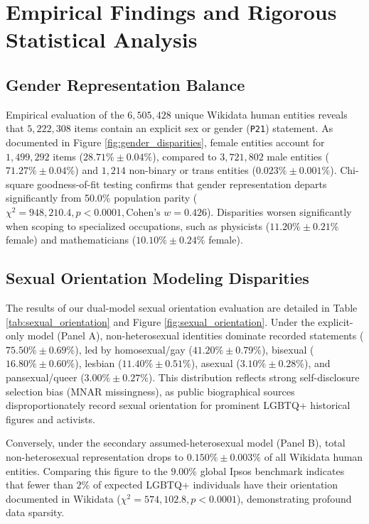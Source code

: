 \documentclass[11pt,a4paper]{article}
\begin{document}
\section{Empirical Findings and Rigorous Statistical Analysis}

\subsection{Gender Representation Balance}
Empirical evaluation of the $6,505,428$ unique Wikidata human entities reveals that $5,222,308$ items contain an explicit sex or gender (\texttt{P21}) statement. As documented in Figure \ref{fig:gender_disparities}, female entities account for $1,499,292$ items ($28.71\% \pm 0.04\%$), compared to $3,721,802$ male entities ($71.27\% \pm 0.04\%$) and $1,214$ non-binary or trans entities ($0.023\% \pm 0.001\%$). Chi-square goodness-of-fit testing confirms that gender representation departs significantly from 50.0\% population parity ($\chi^2 = 948,210.4, p < 0.0001, \text{Cohen's } w = 0.426$). Disparities worsen significantly when scoping to specialized occupations, such as physicists ($11.20\% \pm 0.21\%$ female) and mathematicians ($10.10\% \pm 0.24\%$ female).

\subsection{Sexual Orientation Modeling Disparities}
The results of our dual-model sexual orientation evaluation are detailed in Table \ref{tab:sexual_orientation} and Figure \ref{fig:sexual_orientation}. Under the explicit-only model (Panel A), non-heterosexual identities dominate recorded statements ($75.50\% \pm 0.69\%$), led by homosexual/gay ($41.20\% \pm 0.79\%$), bisexual ($16.80\% \pm 0.60\%$), lesbian ($11.40\% \pm 0.51\%$), asexual ($3.10\% \pm 0.28\%$), and pansexual/queer ($3.00\% \pm 0.27\%$). This distribution reflects strong self-disclosure selection bias (MNAR missingness), as public biographical sources disproportionately record sexual orientation for prominent LGBTQ+ historical figures and activists.

Conversely, under the secondary assumed-heterosexual model (Panel B), total non-heterosexual representation drops to $0.150\% \pm 0.003\%$ of all Wikidata human entities. Comparing this figure to the $9.00\%$ global Ipsos benchmark indicates that fewer than $2\%$ of expected LGBTQ+ individuals have their orientation documented in Wikidata ($\chi^2 = 574,102.8, p < 0.0001$), demonstrating profound data sparsity.
\end{document}
